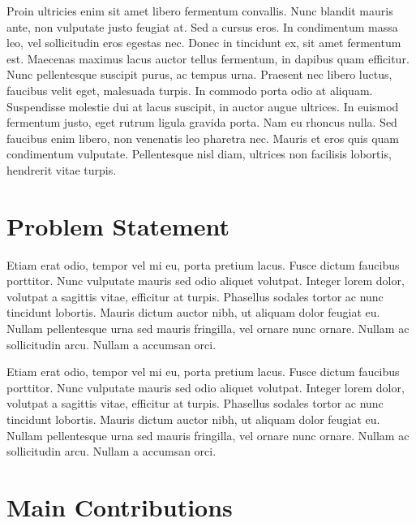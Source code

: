Proin ultricies enim sit amet libero fermentum convallis. Nunc blandit mauris ante, non vulputate justo feugiat at. Sed a cursus eros. In condimentum massa leo, vel sollicitudin eros egestas nec. Donec in tincidunt ex, sit amet fermentum est. Maecenas maximus lacus auctor tellus fermentum, in dapibus quam efficitur. Nunc pellentesque suscipit purus, ac tempus urna. Praesent nec libero luctus, faucibus velit eget, malesuada turpis. In commodo porta odio at aliquam. Suspendisse molestie dui at lacus suscipit, in auctor augue ultrices. In euismod fermentum justo, eget rutrum ligula gravida porta. Nam eu rhoncus nulla. Sed faucibus enim libero, non venenatis leo pharetra nec. Mauris et eros quis quam condimentum vulputate. Pellentesque nisl diam, ultrices non facilisis lobortis, hendrerit vitae turpis. \newline



\section{Problem Statement}
\label{sec:problem_statement}

Etiam erat odio, tempor vel mi eu, porta pretium lacus. Fusce dictum faucibus porttitor. Nunc vulputate mauris sed odio aliquet volutpat. Integer lorem dolor, volutpat a sagittis vitae, efficitur at turpis. Phasellus sodales tortor ac nunc tincidunt lobortis. Mauris dictum auctor nibh, ut aliquam dolor feugiat eu. Nullam pellentesque urna sed mauris fringilla, vel ornare nunc ornare. Nullam ac sollicitudin arcu. Nullam a accumsan orci. \newline

Etiam erat odio, tempor vel mi eu, porta pretium lacus. Fusce dictum faucibus porttitor. Nunc vulputate mauris sed odio aliquet volutpat. Integer lorem dolor, volutpat a sagittis vitae, efficitur at turpis. Phasellus sodales tortor ac nunc tincidunt lobortis. Mauris dictum auctor nibh, ut aliquam dolor feugiat eu. Nullam pellentesque urna sed mauris fringilla, vel ornare nunc ornare. Nullam ac sollicitudin arcu. Nullam a accumsan orci. \newline


\section{Main Contributions}
\label{sec:main_contributions}

